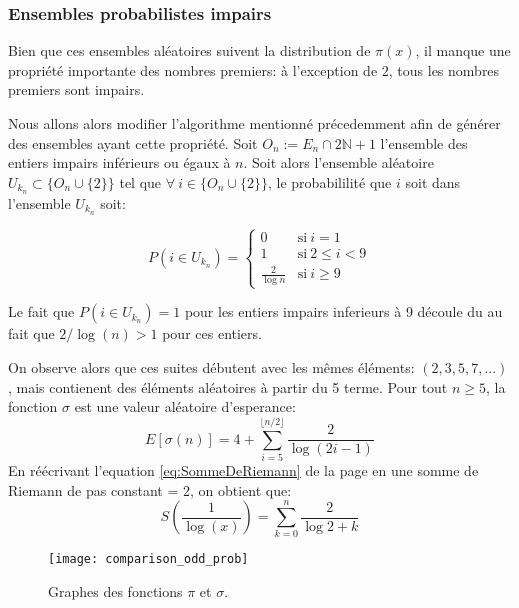 \documentclass[../main.tex]{report}
\begin{document}
    \label{sec:odd_prob}
\subsubsection{Ensembles probabilistes impairs}
Bien que ces ensembles aléatoires suivent la distribution de $\pi(x)$, il manque une propriété importante des nombres premiers: à l'exception de $2$, tous les nombres premiers sont impairs.

Nous allons alors modifier l'algorithme mentionné précedemment afin de générer des ensembles ayant cette propriété. 
Soit $O_n := E_n \cap 2 \mathbb{N} +1$ l'ensemble des entiers impairs inférieurs ou égaux à $n$. 
Soit alors l'ensemble aléatoire 
$U_{k_n} \subset \{O_n \cup \{2\}\}$
tel que $\forall~i \in \{O_n \cup \{2\}\}$, le probabililité que $i$ soit dans l'ensemble $U_{k_n}$ soit:

\[
P(i \in U_{k_n}) = 
\left\{ 
    \begin{array}{cl}
         0 & \mbox{si}~i = 1 \\
         1 & \mbox{si}~ 2 \leq i < 9 \\
         \frac{2}{\log n} & \mbox{si}~i \geq 9
    \end{array}
\right.
\]

Le fait que $P(i \in U_{k_n}) = 1$ pour les entiers impairs inferieurs à 9 découle du au fait que $2/\log(n) > 1$ pour ces entiers.

On observe alors que ces suites débutent avec les mêmes éléments: $ (2,3,5,7,...) $, mais contienent des éléments aléatoires à partir du 5 terme. 
Pour tout $n \geq 5$, la fonction $\sigma$ est une valeur aléatoire d'esperance: 
\[
E[\sigma(n)] = 
4 + \sum_{i=5}^{\lfloor{n/2}\rfloor} \frac{2}{\log (2i-1)}
\]
En réécrivant l'equation \ref{eq:SommeDeRiemann} de la page \pageref{eq:SommeDeRiemann} en une somme de Riemann de pas constant = 2, on obtient que:
\[
S(\frac{1}{\log(x)}) = \sum_{k=0}^{n}\frac{2}{\log 2+k}
\]

\begin{figure}[H]
\texttt{[image: comparison\_odd\_prob]}

\caption{Graphes des fonctions $\pi$ et $\sigma$.}
\label{fig:comparison_sigma_prob}
\end{figure}
\end{document}
